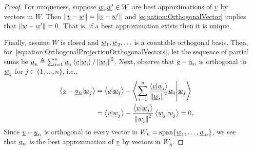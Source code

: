 \begin{proof}

For uniqueness, suppose $\underline{w}, \underline{w}' \in W$ are best approximations of $\underline{v}$ by vectors in $W$.
Then $\left\| \underline{v} - \underline{w} \right\| = \left\| \underline{v} - \underline{w}' \right\|$ and \eqref{equation:OrthogonalVector} implies that $\left\| \underline{w} - \underline{w}' \right\| = 0$.
That is, if a best approximation exists then it is unique.

Finally, assume $W$ is closed and $\underline{w}_1,\underline{w}_2, \ldots$ is a countable orthogonal basis.
Then, for~\eqref{equation:OrthogonalProjectionOrthogonalVectors}, let the sequence of partial sums be $\underline{u}_n \triangleq \sum_{i=1}^n \underline{w}_i \left\langle \underline{v} | \underline{w}_i \right\rangle / \left\| \underline{w}_i \right\|^2$.
Next, observe that $\underline{v} -\underline{u}_n$ is orthogonal to $\underline{w}_j$ for $j \in \{1,\ldots,n\}$, i.e.,
\begin{equation*}
\begin{split}
\left\langle \underline{v} - \underline{u_n} | \underline{w}_j \right\rangle
&= \left\langle \underline{v} | \underline{w}_j \right\rangle
- \left\langle \sum_{i=1}^n \frac{ \left\langle \underline{v} | \underline{w}_i \right\rangle }{ \left\| \underline{w}_i \right\|^2 } \underline{w}_i \middle| \underline{w}_j \right\rangle \\
&= \left\langle \underline{v} | \underline{w}_j \right\rangle
- \frac{ \left\langle \underline{v} | \underline{w}_j \right\rangle }{ \left\| \underline{w}_i \right\|^2 } \left\langle \underline{w}_j | \underline{w}_j \right\rangle
= 0.
\end{split}
\end{equation*}
Since $\underline{v} - \underline{u}_n$ is orthogonal to every vector in $W_n = \mathrm{span} \{\underline{w}_1,\ldots,\underline{w}_n\}$, we see that $\underline{u}_n$ is the best approximation of $\underline{v}$ by vectors in $W_n$.


\end{proof}

